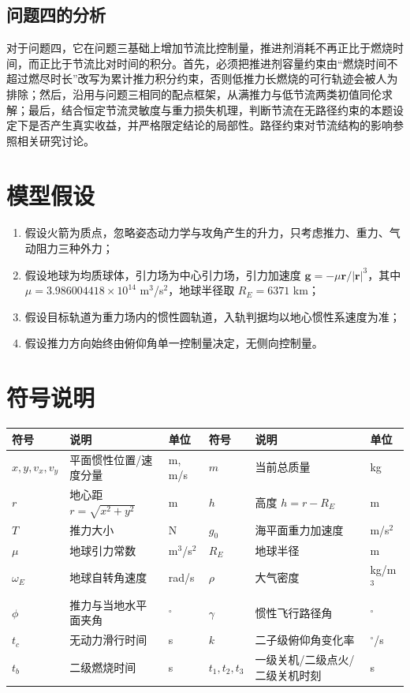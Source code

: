 \documentclass[withoutpreface,bwprint]{cumcmthesis}
\begin{document}
\subsection{问题四的分析}
对于问题四，它在问题三基础上增加节流比控制量，推进剂消耗不再正比于燃烧时间，而正比于节流比对时间的积分。首先，必须把推进剂容量约束由“燃烧时间不超过燃尽时长”改写为累计推力积分约束，否则低推力长燃烧的可行轨迹会被人为排除；然后，沿用与问题三相同的配点框架，从满推力与低节流两类初值同伦求解；最后，结合恒定节流灵敏度与重力损失机理，判断节流在无路径约束的本题设定下是否产生真实收益，并严格限定结论的局部性。路径约束对节流结构的影响参照相关研究讨论\cite{nair2022}。

\section{模型假设}
\begin{enumerate}
    \item 假设火箭为质点，忽略姿态动力学与攻角产生的升力，只考虑推力、重力、气动阻力三种外力；
    \item 假设地球为均质球体，引力场为中心引力场，引力加速度 $\bm g=-\mu \bm r/|\bm r|^3$，其中 $\mu=3.986004418\times10^{14}$ m$^3$/s$^2$，地球半径取 $R_E=6371$ km；
    \item 假设目标轨道为重力场内的惯性圆轨道，入轨判据均以地心惯性系速度为准；
    \item 假设推力方向始终由俯仰角单一控制量决定，无侧向控制量。
\end{enumerate}

\section{符号说明}
\begin{center}
\begin{tabular}{p{}p{}p{}|p{}p{}p{}}
\toprule[1.5pt]
符号 & 说明 & 单位 & 符号 & 说明 & 单位 \\
\midrule[1pt]
$x,y,v_x,v_y$ & 平面惯性位置/速度分量 & m,\,m/s & $m$ & 当前总质量 & kg \\
$r$ & 地心距 $r=\sqrt{x^2+y^2}$ & m & $h$ & 高度 $h=r-R_E$ & m \\
$T$ & 推力大小 & N & $g_0$ & 海平面重力加速度 & m/s$^2$ \\
$\mu$ & 地球引力常数 & m$^3$/s$^2$ & $R_E$ & 地球半径 & m \\
$\omega_E$ & 地球自转角速度 & rad/s & $\rho$ & 大气密度 & kg/m$^3$ \\
$\phi$ & 推力与当地水平面夹角 & $^\circ$ & $\gamma$ & 惯性飞行路径角 & $^\circ$ \\
$t_c$ & 无动力滑行时间 & s & $k$ & 二子级俯仰角变化率 & $^\circ$/s \\
$t_b$ & 二级燃烧时间 & s & $t_1,t_2,t_3$ & 一级关机/二级点火/二级关机时刻 & s \\
\bottomrule[1.5pt]
\end{tabular}
\end{center}
\end{document}
